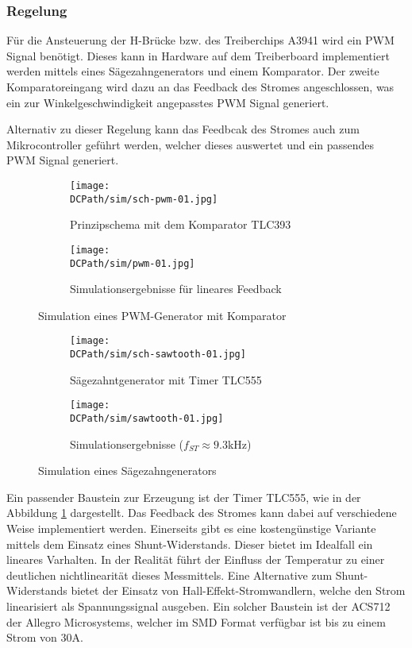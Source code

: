 \subsubsection{Regelung}
\fi
Für die Ansteuerung der H-Brücke bzw. des Treiberchips A3941 wird ein PWM
Signal benötigt. Dieses kann in Hardware auf dem Treiberboard implementiert
werden mittels eines Sägezahngenerators und einem Komparator. Der zweite
Komparatoreingang wird dazu an das Feedback des Stromes angeschlossen, was
ein zur Winkelgeschwindigkeit angepasstes PWM Signal generiert.

Alternativ zu dieser Regelung kann das Feedbcak des Stromes auch zum
Mikrocontroller geführt werden, welcher dieses auswertet und ein passendes
PWM Signal generiert.

\begin{figure}[h!]
	\centering
	\begin{subfigure}[b]{0.45\textwidth}
		\texttt{[image: \\DCPath/sim/sch-pwm-01.jpg]}
		\caption{Prinzipschema mit dem Komparator TLC393}
	\end{subfigure}
	\begin{subfigure}[b]{0.45\textwidth}
		\texttt{[image: \\DCPath/sim/pwm-01.jpg]}
		\caption{Simulationsergebnisse für lineares Feedback}
	\end{subfigure}
	\caption{Simulation eines PWM-Generator mit Komparator}
\end{figure}

\begin{figure}[h!]
	\centering
	\begin{subfigure}[b]{0.45\textwidth}
		\texttt{[image: \\DCPath/sim/sch-sawtooth-01.jpg]}
		\caption{Sägezahntgenerator mit Timer TLC555}
	\end{subfigure}
	\begin{subfigure}[b]{0.45\textwidth}
		\texttt{[image: \\DCPath/sim/sawtooth-01.jpg]}
		\caption{Simulationsergebnisse ($f_{ST} \approx 9.3$kHz)}
	\end{subfigure}
	\caption{Simulation eines Sägezahngenerators}
	\label{fig:sawtooth}
\end{figure}

Ein passender Baustein zur Erzeugung ist der Timer TLC555, wie in der
Abbildung \ref{fig:sawtooth} dargestellt. Das Feedback des Stromes kann
dabei auf verschiedene Weise implementiert werden. Einerseits gibt es eine
kostengünstige Variante mittels dem Einsatz eines Shunt-Widerstands. Dieser
bietet im Idealfall ein lineares Varhalten. In der Realität führt der
Einfluss der Temperatur zu einer deutlichen nichtlinearität dieses
Messmittels. Eine Alternative zum Shunt-Widerstands bietet der Einsatz von
Hall-Effekt-Stromwandlern, welche den Strom linearisiert als Spannungssignal
ausgeben. Ein solcher Baustein ist der ACS712 der Allegro Microsystems,
welcher im SMD Format verfügbar ist bis zu einem Strom von 30A.

